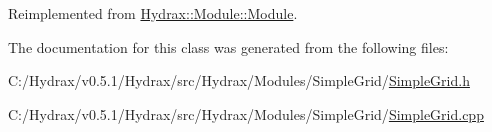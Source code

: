 Reimplemented from \hyperlink{class_hydrax_1_1_module_1_1_module_2042d450f99d9348fa4b7bd29ba89df3}{Hydrax::Module::Module}.

The documentation for this class was generated from the following files:\begin{CompactItemize}
\item 
C:/Hydrax/v0.5.1/Hydrax/src/Hydrax/Modules/SimpleGrid/\hyperlink{_simple_grid_8h}{SimpleGrid.h}\item 
C:/Hydrax/v0.5.1/Hydrax/src/Hydrax/Modules/SimpleGrid/\hyperlink{_simple_grid_8cpp}{SimpleGrid.cpp}\end{CompactItemize}

